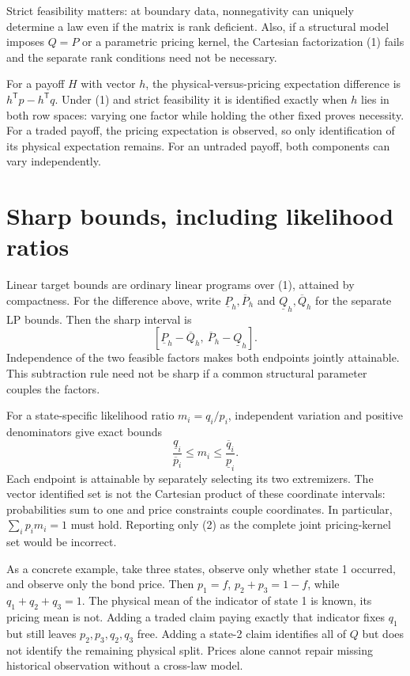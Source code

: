 \documentclass[11pt]{article}
\begin{document}
Strict feasibility matters: at boundary data, nonnegativity can uniquely determine a law even if the matrix is rank deficient. Also, if a structural model imposes $Q=P$ or a parametric pricing kernel, the Cartesian factorization (1) fails and the separate rank conditions need not be necessary.

For a payoff $H$ with vector $h$, the physical-versus-pricing expectation difference is $h^{\mathsf T}p-h^{\mathsf T}q$. Under (1) and strict feasibility it is identified exactly when $h$ lies in both row spaces: varying one factor while holding the other fixed proves necessity. For a traded payoff, the pricing expectation is observed, so only identification of its physical expectation remains. For an untraded payoff, both components can vary independently.

\section*{Sharp bounds, including likelihood ratios}
Linear target bounds are ordinary linear programs over (1), attained by compactness. For the difference above, write $\underline P_h,\overline P_h$ and $\underline Q_h,\overline Q_h$ for the separate LP bounds. Then the sharp interval is
\[
 [\underline P_h-\overline Q_h,\ \overline P_h-\underline Q_h].
\]
Independence of the two feasible factors makes both endpoints jointly attainable. This subtraction rule need not be sharp if a common structural parameter couples the factors.

For a state-specific likelihood ratio $m_i=q_i/p_i$, independent variation and positive denominators give exact bounds
\[
 \frac{\underline q_i}{\overline p_i}\leq m_i\leq
 \frac{\overline q_i}{\underline p_i}. \tag{2}
\]
Each endpoint is attainable by separately selecting its two extremizers. The vector identified set is not the Cartesian product of these coordinate intervals: probabilities sum to one and price constraints couple coordinates. In particular, $\sum_ip_im_i=1$ must hold. Reporting only (2) as the complete joint pricing-kernel set would be incorrect.

As a concrete example, take three states, observe only whether state 1 occurred, and observe only the bond price. Then $p_1=f$, $p_2+p_3=1-f$, while $q_1+q_2+q_3=1$. The physical mean of the indicator of state 1 is known, its pricing mean is not. Adding a traded claim paying exactly that indicator fixes $q_1$ but still leaves $p_2,p_3,q_2,q_3$ free. Adding a state-2 claim identifies all of $Q$ but does not identify the remaining physical split. Prices alone cannot repair missing historical observation without a cross-law model.
\end{document}
